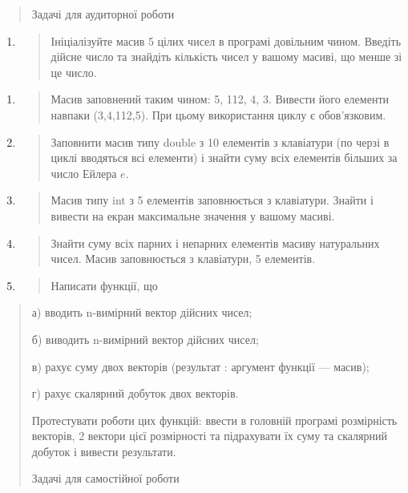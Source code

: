 \documentclass[]{article}
\begin{document}
\begin{quote}
Задачі для аудиторної роботи
\end{quote}

\begin{enumerate}
\def\labelenumi{\arabic{enumi})}
\item
  \begin{quote}
  Ініціалізуйте масив 5 цілих чисел в програмі довільним чином. Введіть
  дійсне число та знайдіть кількість чисел у вашому масиві, що менше зі
  це число.
  \end{quote}
\end{enumerate}

\begin{enumerate}
\def\labelenumi{\arabic{enumi})}
\item
  \begin{quote}
  Масив заповнений таким чином: 5, 112, 4, 3. Вивести його елементи
  навпаки (3,4,112,5). При цьому використання циклу є обов'язковим.
  \end{quote}
\item
  \begin{quote}
  Заповнити масив типу double з 10 елементів з клавіатури (по черзі в
  циклі вводяться всі елементи) і знайти суму всіх елементів більших за
  число Ейлера \(e\).
  \end{quote}
\item
  \begin{quote}
  Масив типу int з 5 елементів заповнюється з клавіатури. Знайти і
  вивести на екран максимальне значення у вашому масиві.
  \end{quote}
\item
  \begin{quote}
  Знайти суму всіх парних і непарних елементів масиву натуральних чисел.
  Масив заповнюється з клавіатури, 5 елементів.
  \end{quote}
\item
  \begin{quote}
  \protect\hypertarget{_Hlk65236602}{}{}Написати функції, що
  \end{quote}
\end{enumerate}

\begin{quote}
а) вводить n-вимірний вектор дійсних чисел;

б) виводить n-вимірний вектор дійсних чисел;

в) рахує суму двох векторів (результат : аргумент функції --- масив);

г) рахує скалярний добуток двох векторів.

Протестувати роботи цих функцій: ввести в головній програмі розмірність
векторів, 2 вектори цієї розмірності та підрахувати їх суму та скалярний
добуток і вивести результати.

Задачі для самостійної роботи
\end{quote}
\end{document}
